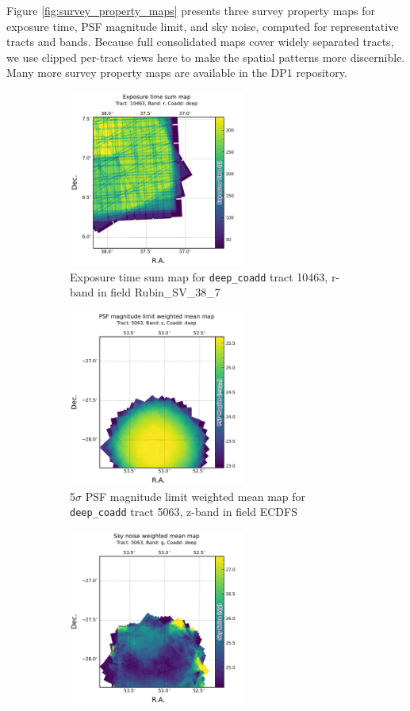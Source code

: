 Figure \ref{fig:survey_property_maps} presents three survey property maps for exposure time, \gls{PSF} magnitude limit, and sky noise, computed for representative tracts and bands.
Because full consolidated maps cover widely separated tracts, we use clipped per-\gls{tract} views here to make the spatial patterns more discernible.
Many more survey property maps are available in the DP1 repository.
\begin{figure}[hbt!]
  \centering
  \begin{subfigure}[t]{0.31\textwidth}
  \includegraphics[width=\linewidth, height=5.8cm]{deepCoadd_exposure_time_map_sum_tract10463_rband.pdf}
  \caption{Exposure time sum map for \texttt{deep\_coadd} \gls{tract} 10463, r-band in field Rubin\_SV\_38\_7}
  \end{subfigure}\hfill
  \begin{subfigure}[t]{0.31\textwidth}
  \includegraphics[width=\linewidth, height=5.8cm]{deepCoadd_psf_maglim_map_weighted_mean_tract5063_zband.pdf}
  \caption{5$\sigma$ \gls{PSF} magnitude limit weighted mean map for \texttt{deep\_coadd} \gls{tract} 5063, z-band in field ECDFS}
  \end{subfigure}\hfill
    \begin{subfigure}[t]{0.31\textwidth}
  \includegraphics[width=\linewidth, height=5.8cm]{deepCoadd_sky_noise_map_weighted_mean_tract5063_gband.pdf}

\end{subfigure}
\end{figure}
